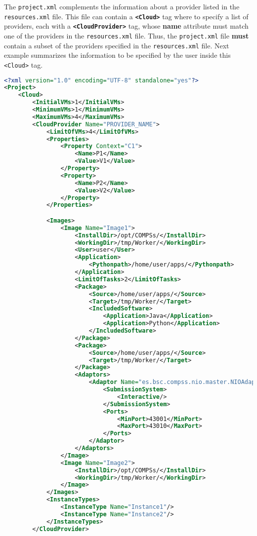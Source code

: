 The \texttt{project.xml} complements the information about a provider listed in the \texttt{resources.xml} file.
This file can contain a \textbf{\texttt{<Cloud>}} tag where to specify a list of providers, each with a
\textbf{\texttt{<CloudProvider>}} tag, whose \textbf{name} attribute must match one of the providers in the
\texttt{resources.xml} file. Thus, the \texttt{project.xml} file \textbf{must} contain a subset of the providers
specified in the \texttt{resources.xml} file. Next example summarizes the information to be specified by the user
inside this \texttt{<Cloud>} tag.

\begin{lstlisting}[language=xml]
<?xml version="1.0" encoding="UTF-8" standalone="yes"?>
<Project>
    <Cloud>
        <InitialVMs>1</InitialVMs>
        <MinimumVMs>1</MinimumVMs>
        <MaximumVMs>4</MaximumVMs>
        <CloudProvider Name="PROVIDER_NAME">
            <LimitOfVMs>4</LimitOfVMs>
            <Properties>
                <Property Context="C1">
                    <Name>P1</Name>
                    <Value>V1</Value>
                </Property>
                <Property>
                    <Name>P2</Name>
                    <Value>V2</Value>
                </Property>
            </Properties>

            <Images>
                <Image Name="Image1">
                    <InstallDir>/opt/COMPSs/</InstallDir>
                    <WorkingDir>/tmp/Worker/</WorkingDir>
                    <User>user</User>
                    <Application>
                        <Pythonpath>/home/user/apps/</Pythonpath>
                    </Application>
                    <LimitOfTasks>2</LimitOfTasks>
                    <Package>
                        <Source>/home/user/apps/</Source>
                        <Target>/tmp/Worker/</Target>
                        <IncludedSoftware>
                            <Application>Java</Application>
                            <Application>Python</Application>
                        </IncludedSoftware>
                    </Package>
                    <Package>
                        <Source>/home/user/apps/</Source>
                        <Target>/tmp/Worker/</Target>
                    </Package>
                    <Adaptors>
                        <Adaptor Name="es.bsc.compss.nio.master.NIOAdaptor">
                            <SubmissionSystem>
                                <Interactive/>
                            </SubmissionSystem>
                            <Ports>
                                <MinPort>43001</MinPort>
                                <MaxPort>43010</MaxPort>
                            </Ports>
                        </Adaptor>
                    </Adaptors>
                </Image>
                <Image Name="Image2">
                    <InstallDir>/opt/COMPSs/</InstallDir>
                    <WorkingDir>/tmp/Worker/</WorkingDir>
                </Image>
            </Images>
            <InstanceTypes>
                <InstanceType Name="Instance1"/>
                <InstanceType Name="Instance2"/>
            </InstanceTypes>
        </CloudProvider>


\end{lstlisting}
